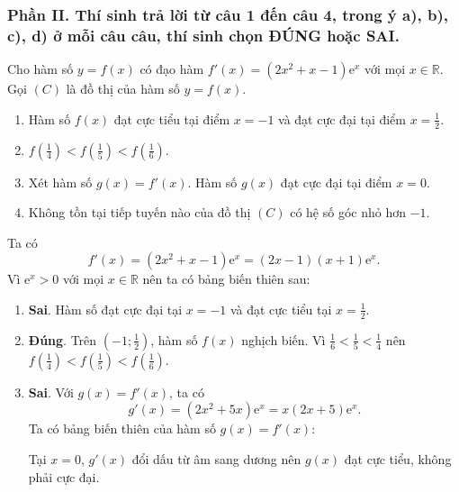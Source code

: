 \subsubsection*{Phần II. Thí sinh trả lời từ câu 1 đến câu 4, trong ý a), b), c), d) ở mỗi câu câu, thí sinh chọn ĐÚNG hoặc SAI.}
\setcounter{bt}{0}\setcounter{bt}{0}
\begin{baitap}
	Cho hàm số $y = f(x)$ có đạo hàm $f'(x) = (2x^2 + x - 1)\mathrm{e}^x$ với mọi $x \in \mathbb{R}$. Gọi $(C)$ là đồ thị của hàm số $y = f(x)$. 
	\begin{enumerate}
		\item Hàm số $f(x)$ đạt cực tiểu tại điểm $x = -1$ và đạt cực đại tại điểm $x = \frac{1}{2}$.
		\item $f\left(\frac{1}{4}\right) < f\left(\frac{1}{5}\right) < f\left(\frac{1}{6}\right)$.
		\item Xét hàm số $g(x) = f'(x)$. Hàm số $g(x)$ đạt cực đại tại điểm $x = 0$.
		\item Không tồn tại tiếp tuyến nào của đồ thị $(C)$ có hệ số góc nhỏ hơn $-1$.
	\end{enumerate}
	\begin{traloi}
		Ta có
		\[
		f'(x)=(2x^2+x-1)\mathrm{e}^x=(2x-1)(x+1)\mathrm{e}^x.
		\]
		Vì $\mathrm{e}^x>0$ với mọi $x\in\mathbb{R}$ nên ta có bảng biến thiên sau:
		\begin{center}
		\end{center}
		\begin{enumerate}
			\item \textbf{Sai}. Hàm số đạt cực đại tại $x=-1$ và đạt cực tiểu tại $x=\frac12$.
			
			\item \textbf{Đúng}. Trên $\left(-1;\frac12\right)$, hàm số $f(x)$ nghịch biến. Vì $\frac16<\frac15<\frac14$ nên
			$f\left(\frac14\right)<f\left(\frac15\right)<f\left(\frac16\right)$.
			
			\item \textbf{Sai}. Với $g(x)=f'(x)$, ta có
			\[
			g'(x)=(2x^2+5x)\mathrm{e}^x=x(2x+5)\mathrm{e}^x.
			\]
			Ta có bảng biến thiên của hàm số $g(x)= f'(x) $:
			\begin{center}
			\end{center}
			Tại $x=0$, $g'(x)$ đổi dấu từ âm sang dương nên $g(x)$ đạt cực tiểu, không phải cực đại.
			

\end{enumerate}
\end{traloi}
\end{baitap}
